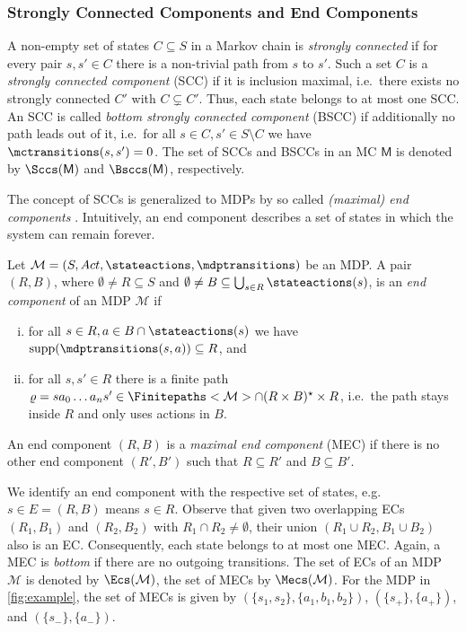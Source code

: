 \documentclass{article}
\newcommand{\unionSym}{\cup}
\newcommand{\unionBin}{\mathbin{\unionSym}}
\newcommand{\intersectionSym}{\cap}
\newcommand{\intersectionBin}{\mathbin{\intersectionSym}}
\newcommand{\UnionSym}{\bigcup}
\newcommand{\union}{\unionBin}
\newcommand{\intersection}{\intersectionBin}
\newcommand{\Union}{\UnionSym}
\newcommand{\MC}{\mathsf{M}}
\newcommand{\MDP}{\mathcal{M}}
\newcommand{\States}{S}
\newcommand{\Actions}{Act}
\newcommand{\finitepath}{\varrho}
\DeclareMathOperator{\support}{supp}
\newcommand{\targetstate}{s_+}
\newcommand{\sinkstate}{s_-}
\begin{document}
\subsubsection*{Strongly Connected Components and End Components}
A non-empty set of states $C \subseteq \States$ in a Markov chain is \emph{strongly connected} if for every pair $s, s' \in C$ there is a non-trivial path from $s$ to $s'$.
Such a set $C$ is a \emph{strongly connected component} (SCC) if it is inclusion maximal, i.e.\ there exists no strongly connected $C'$ with $C \subsetneq C'$.
Thus, each state belongs to at most one SCC.
An SCC is called \emph{bottom strongly connected component} (BSCC) if additionally no path leads out of it, i.e.\ for all $s \in C, s' \in S \setminus C$ we have $\mctransitions(s, s') = 0$.
The set of SCCs and BSCCs in an MC $\MC$ is denoted by $\Sccs(\MC)$ and $\Bsccs(\MC)$, respectively.

The concept of SCCs is generalized to MDPs by so called \emph{(maximal) end components} \cite{de1997formal}.
Intuitively, an end component describes a set of states in which the system can remain forever.
\begin{definition} \label{def:ec}
	Let $\MDP = (\States, \Actions, \stateactions, \mdptransitions)$ be an MDP.
	A pair $(R, B)$, where $\emptyset \neq R \subseteq \States$ and $\emptyset \neq B \subseteq \Union_{s \in R} \stateactions(s)$, is an \emph{end component} of an MDP $\MDP$ if
	\begin{enumerate}[(i)]
		\item for all $s \in R, a \in B \intersection \stateactions(s)$ we have $\support(\mdptransitions(s, a)) \subseteq R$, and \label{def:ec:support}
		\item for all $s, s' \in R$ there is a finite path $\finitepath = s a_0 \dots a_n s' \in \Finitepaths<\MDP> \intersection (R \times B)^\star \times R$, i.e.\ the path stays inside $R$ and only uses actions in $B$. \label{def:ec:reach}
	\end{enumerate}
	An end component $(R, B)$ is a \emph{maximal end component} (MEC) if there is no other end component $(R', B')$ such that $R \subseteq R'$ and $B \subseteq B'$.
\end{definition}
We identify an end component with the respective set of states, e.g.\ $s \in E = (R, B)$ means $s \in R$.
Observe that given two overlapping ECs $(R_1, B_1)$ and $(R_2, B_2)$ with $R_1 \intersection R_2 \neq \emptyset$, their union $(R_1 \union R_2, B_1 \union B_2)$ also is an EC.
Consequently, each state belongs to at most one MEC.
Again, a MEC is \emph{bottom} if there are no outgoing transitions.
The set of ECs of an MDP $\MDP$ is denoted by $\Ecs(\MDP)$, the set of MECs by $\Mecs(\MDP)$.
For the MDP in \cref{fig:example}, the set of MECs is given by $(\{s_1, s_2\}, \{a_1, b_1, b_2\})$, $(\{\targetstate\}, \{a_+\})$, and $(\{\sinkstate\}, \{a_-\})$.
\end{document}
